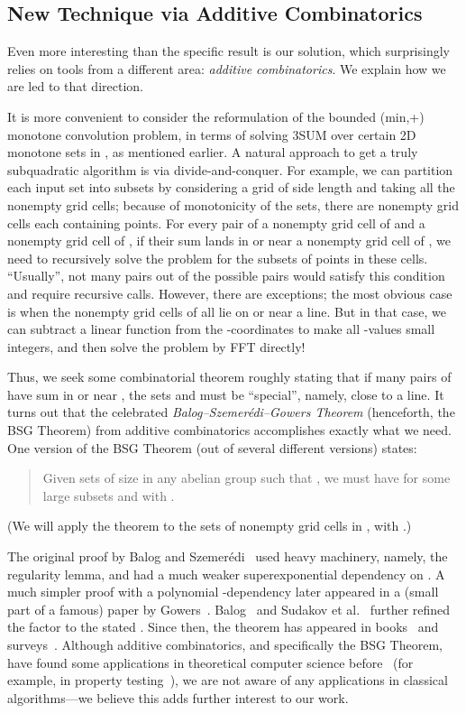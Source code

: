 \documentclass[11pt]{article}
\begin{document}
\subsection{New Technique via Additive Combinatorics}

Even more interesting than the specific result
is our solution, which surprisingly relies on tools from a
different area: \emph{additive combinatorics}.  We explain
how we are led to that direction.

It is more convenient to consider the reformulation of
the bounded (min,+) monotone convolution problem, in terms
of solving 3SUM over certain 2D monotone sets 
in , as mentioned earlier.
A natural approach to get a truly subquadratic algorithm
is via divide-and-conquer.  For example, we can
partition each input set into
subsets by considering a grid of side length  and
taking all the nonempty grid cells;
because of monotonicity of the sets, there are  nonempty grid cells
each containing  points.
For every pair of a nonempty grid cell of 
and a nonempty grid cell of , if their sum lands
in or near a nonempty grid cell of , we need to
recursively solve the problem for the subsets of points in these
cells.  ``Usually'',
not many pairs out of the  possible pairs would satisfy this condition and require recursive calls.
However, there are exceptions;
the most obvious case is when the nonempty grid cells of  all lie on or near a line.
But in that case, we can subtract a linear function from
the -coordinates to make all -values small integers, and
then solve the problem by FFT directly!

Thus, we seek some combinatorial theorem roughly stating that
if many pairs of  have sum
in or near , the sets  and  must be ``special'', namely,
close to a line.
It turns out that
the celebrated {\em Balog--Szemer\'edi--Gowers Theorem} (henceforth,
the BSG Theorem) from additive combinatorics accomplishes exactly
what we need.
One version of
the BSG Theorem (out of several different versions) states:
\begin{quote}
Given sets  of size
 in any abelian group such that ,
we must have  for some
large subsets  and  with
.
\end{quote}
(We will apply the theorem to the sets of nonempty grid cells
in , with .)

The original proof by
Balog and Szemer\'edi~\cite{BS94}
used heavy machinery, namely, the regularity lemma, and
had a much weaker superexponential dependency on .
A much simpler proof with a polynomial -dependency later appeared in a (small part of a famous)
paper by Gowers~\cite{Gowers01}.  Balog~\cite{Balog07} and Sudakov
et al.~\cite{SSV94} further refined the factor to the stated .
Since then, the theorem has appeared in books~\cite{TV06} and surveys~\cite{Lovett14,Viola11}.
Although additive combinatorics, and specifically the BSG Theorem, have found some applications in theoretical computer science
before~\cite{Lovett14,Viola11} (for example, in
property testing~\cite{BLR}), we are not aware of any applications in classical algorithms---we believe this adds further interest to our work.
\end{document}
